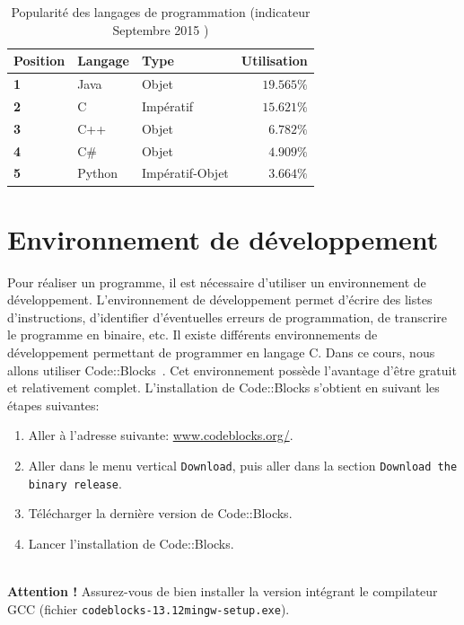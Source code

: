\documentclass[a4paper,11pt]{book}
\newenvironment{warning} 
   {~\\ \textbf{Attention !}}{\\}
\theoremstyle{definition}
\begin{document}
\begin{table}[!h]
\centering
\begin{tabular}{p{2.5cm}p{3cm}p{3cm}r}
  \hline
  \textbf{Position} & Langage & Type & Utilisation \\
  \hline
 \textbf{1}  & Java &Objet & $19.565\%$\\
 \textbf{2} & C & Impératif&$15.621\%$\\
 \textbf{3} & C++ & Objet&$6.782\%$\\
 \textbf{4} & C\# & Objet&$4.909\%$\\
 \textbf{5} & Python & Impératif-Objet&$3.664\%$\\
 \hline
\end{tabular}
\caption{Popularité des langages de programmation (indicateur Septembre 2015 \cite{TIO}) }
\label{pop_langage}
\end{table}

\section{Environnement de développement}

Pour réaliser un programme, il est nécessaire d'utiliser un
environnement de développement. L'environnement de développement
permet d'écrire des listes d'instructions, d'identifier
d'éventuelles erreurs de programmation, de transcrire le programme
en binaire, etc. Il existe différents environnements de
développement permettant de programmer en langage C. Dans ce
cours, nous allons utiliser Code::Blocks~\cite{COD}. Cet
environnement possède l'avantage d'être gratuit et relativement complet.
L'installation de Code::Blocks s'obtient en suivant les étapes
suivantes:
\begin{enumerate}
\item Aller à l'adresse suivante: \url{www.codeblocks.org/}.
\item Aller dans le menu vertical \texttt{Download}, puis aller dans la section \texttt{Download the binary release}.
\item Télécharger la dernière version de Code::Blocks.
\item Lancer l'installation de Code::Blocks.
\end{enumerate}

\begin{warning}
Assurez-vous de bien installer la version intégrant le compilateur GCC (fichier \texttt{codeblocks-13.12mingw-setup.exe}).
\end{warning}
\end{document}
